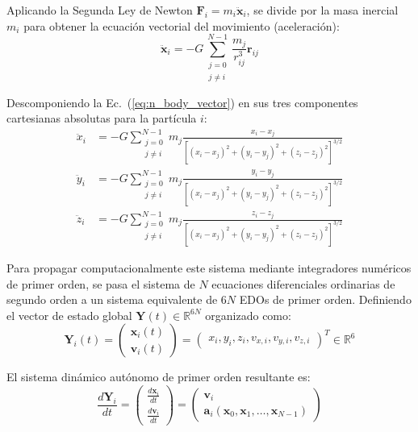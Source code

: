 \documentclass[11pt, a4paper]{article}
\begin{document}
	Aplicando la Segunda Ley de Newton $\mathbf{F}_i = m_i \ddot{\mathbf{x}}_i$, se  divide por la masa inercial $m_i$ para obtener la ecuación vectorial del movimiento (aceleración):
	\begin{equation}
		\ddot{\mathbf{x}}_i = -G \sum_{\substack{j=0 \\ j \neq i}}^{N-1} \frac{m_j}{r_{ij}^3} \mathbf{r}_{ij}
		\label{eq:n_body_vector}
	\end{equation}
	
	Descomponiendo la Ec.~(\ref{eq:n_body_vector}) en sus tres componentes cartesianas absolutas para la partícula $i$:
	\begin{align}
		\ddot{x}_i &= -G \sum_{\substack{j=0 \\ j \neq i}}^{N-1} m_j \frac{x_i - x_j}{\left[(x_i - x_j)^2 + (y_i - y_j)^2 + (z_i - z_j)^2\right]^{3/2}} \label{eq:acc_x} \\
		\ddot{y}_i &= -G \sum_{\substack{j=0 \\ j \neq i}}^{N-1} m_j \frac{y_i - y_j}{\left[(x_i - x_j)^2 + (y_i - y_j)^2 + (z_i - z_j)^2\right]^{3/2}} \label{eq:acc_y} \\
		\ddot{z}_i &= -G \sum_{\substack{j=0 \\ j \neq i}}^{N-1} m_j \frac{z_i - z_j}{\left[(x_i - x_j)^2 + (y_i - y_j)^2 + (z_i - z_j)^2\right]^{3/2}} \label{eq:acc_z}
	\end{align}
	
	Para propagar computacionalmente este sistema mediante integradores numéricos de primer orden, se pasa el sistema de $N$ ecuaciones diferenciales ordinarias de segundo orden a un sistema equivalente de $6N$ EDOs de primer orden. Definiendo el vector de estado global $\mathbf{Y}(t) \in \mathbb{R}^{6N}$ organizado como:
	\begin{equation}
		\mathbf{Y}_i(t) = \begin{pmatrix} \mathbf{x}_i(t) \\ \mathbf{v}_i(t) \end{pmatrix} = \begin{pmatrix} x_i, y_i, z_i, v_{x,i}, v_{y,i}, v_{z,i} \end{pmatrix}^T \in \mathbb{R}^6
	\end{equation}
	
	El sistema dinámico autónomo de primer orden resultante es:
	\begin{equation}
		\frac{d\mathbf{Y}_i}{dt} = \begin{pmatrix} \frac{d\mathbf{x}_i}{dt} \\[0.5em] \frac{d\mathbf{v}_i}{dt} \end{pmatrix} = \begin{pmatrix} \mathbf{v}_i \\[0.5em] \mathbf{a}_i(\mathbf{x}_0, \mathbf{x}_1, \dots, \mathbf{x}_{N-1}) \end{pmatrix}
		\label{eq:state_space_system}
	\end{equation}
	
\end{document}
